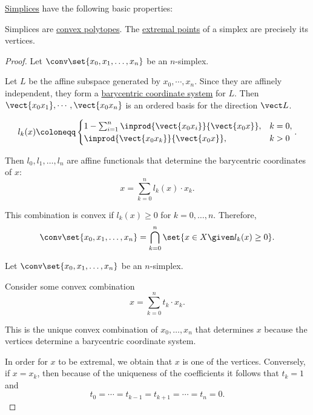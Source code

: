\begin{proposition}\label{thm:def:simplex}
  \hyperref[def:simplex]{Simplices} have the following basic properties:
  \begin{thmenum}
     Simplices are \hyperref[def:convex_polytope]{convex polytopes}.
     The \hyperref[def:extremal_point]{extremal points} of a simplex are precisely its vertices.
  \end{thmenum}
\end{proposition}
\begin{proof}
   Let \( \conv\set{ x_0, x_1, \ldots, x_n } \) be an \( n \)-simplex.

  Let \( L \) be the affine subspace generated by \( x_0, \cdots, x_n \). Since they are affinely independent, they form a \hyperref[def:barycentric_coordinate_system]{barycentric coordinate system} for \( L \). Then \( \vect{x_0 x_1}, \cdots, \vect{x_0 x_n} \) is an ordered basis for the direction \( \vect L \).

  \begin{equation*}
    l_k(x) \coloneqq \begin{cases}
      1 - \sum_{i=1}^n \inprod {\vect{x_0 x_i}} {\vect{x_0 x}}, &k = 0, \\
      \inprod {\vect{x_0 x_k}} {\vect{x_0 x}},                  &k > 0
    \end{cases}.
  \end{equation*}

  Then \( l_0, l_1, \ldots, l_n \) are affine functionals that determine the barycentric coordinates of \( x \):
  \begin{equation*}
    x = \sum_{k=0}^n l_k(x) \cdot x_k.
  \end{equation*}

  This combination is convex if \( l_k(x) \geq 0 \) for \( k = 0, \ldots, n \). Therefore,
  \begin{equation*}
    \conv\set{ x_0, x_1, \ldots, x_n } = \bigcap_{k=0}^n \set{ x \in X \given l_k(x) \geq 0 }.
  \end{equation*}

   Let \( \conv\set{ x_0, x_1, \ldots, x_n } \) be an \( n \)-simplex.

  Consider some convex combination
  \begin{equation*}
    x = \sum_{k=0}^n t_k \cdot x_k.
  \end{equation*}

  This is the unique convex combination of \( x_0, \ldots, x_n \) that determines \( x \) because the vertices determine a barycentric coordinate system.

  In order for \( x \) to be extremal, we obtain that \( x \) is one of the vertices. Conversely, if \( x = x_k \), then because of the uniqueness of the coefficients it follows that \( t_k = 1 \) and
  \begin{equation*}
    t_0 = \cdots = t_{k-1} = t_{k+1} = \cdots = t_n = 0.
  \end{equation*}
\end{proof}

